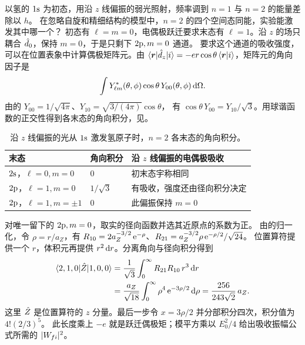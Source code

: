 以氢的 $1\mathrm{s}$ 为初态，用沿 $z$ 线偏振的弱光照射，频率调到 $n = 1$ 与 $n = 2$ 的能量差除以 $h$。
在忽略自旋和精细结构的模型中，$n = 2$ 的四个空间态同能，实验能激发其中哪一个？
初态有 $\ell = m = 0$，电偶极跃迁要求末态有 $\ell = 1$。沿 $z$ 的场只耦合 $\hat{d}_0$，保持 $m = 0$，于是只剩下 $2\mathrm{p},m = 0$ 通道。
要求这个通道的吸收强度，可以在位置表象中计算偶极矩阵元。由 $\langle\bm r\vert\hat{d}_z\vert i\rangle = -er\cos\theta\,\langle\bm r\vert i\rangle$，矩阵元的角向因子是
\[
    \int Y_{\ell m}^\ast(\theta,\phi)\cos\theta\,Y_{00}(\theta,\phi)\mathop{}\!\mathrm{d}\Omega .
\]
由的 $Y_{00} = 1/\sqrt{4\pi}$、$Y_{10} = \sqrt{3/(4\pi)}\cos\theta$，
有 $\cos\theta\,Y_{00} = Y_{10}/\sqrt3$。用球谐函数的正交性得到各末态的角向积分，见。
\begin{table}[htbp]
    \centering
    \caption{沿 $z$ 线偏振的光从 $1\mathrm{s}$ 激发氢原子时，$n = 2$ 各末态的角向积分。}
    \label{tab:hydrogen-dipole-z}
    \begin{tabular}{@{}lll@{}}
        \toprule
        末态 & 角向积分 & 沿 $z$ 线偏振的电偶极吸收\\
        \midrule
        $2\mathrm{s}$，$\ell = 0,m = 0$ & $0$ & 初末态宇称相同\\
        $2\mathrm{p}$，$\ell = 1,m = 0$ & $1/\sqrt3$ & 有吸收，强度还由径向积分决定\\
        $2\mathrm{p}$，$\ell = 1,m = \pm1$ & $0$ & 此偏振保持 $m = 0$\\
        \bottomrule
    \end{tabular}
\end{table}

对唯一留下的 $2\mathrm{p},m = 0$，取实的径向函数并选其近原点的系数为正。
由的归一化，令 $\rho = r/a_Z$，有
$R_{10} = 2a_Z^{-3/2}\mathop{}\!\mathrm{e}^{-\rho}$、$R_{21} = a_Z^{-3/2}\rho\mathop{}\!\mathrm{e}^{-\rho/2}/\sqrt{24}$。
位置算符提供一个 $r$，体积元再提供 $r^2\mathop{}\!\mathrm{d} r$。分离角向与径向积分得到
\begin{equation}
    \begin{alignedat}{1}
        \langle2,1,0\vert\hat{Z}\vert1,0,0\rangle
            &= \frac{1}{\sqrt3}\int_0^\infty R_{21}R_{10}\,r^3\mathop{}\!\mathrm{d} r\\
            &= \frac{a_Z}{\sqrt{18}}\int_0^\infty \rho^4\mathop{}\!\mathrm{e}^{-3\rho/2}\mathop{}\!\mathrm{d}\rho
              = \frac{256}{243\sqrt2}\,a_Z .
    \end{alignedat}
\end{equation}
这里 $\hat{Z}$ 是位置算符的 $z$ 分量。最后一步令 $x = 3\rho/2$ 并分部积分四次，积分值为 $4!(2/3)^5$。
此长度乘上 $-e$ 就是跃迁偶极矩；模平方乘以 $E_0^2/4$ 给出吸收振幅公式所需的 $\lvert W_{fi}\rvert^2$。

